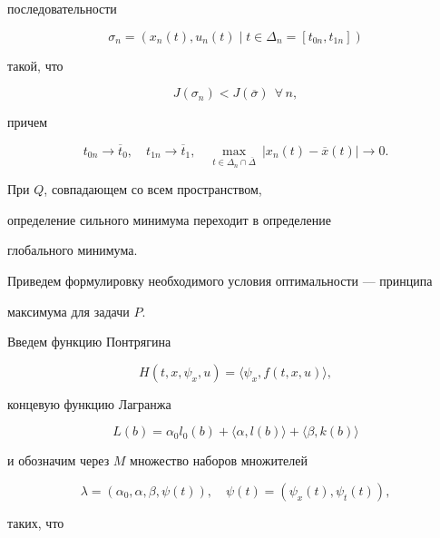 последовательности


$$


\sigma_n =(x_n (t),u_n (t)\mid t\in\Delta_n =\left[t_{0n},


t_{1n}\right])


$$


такой, что


$$


J(\sigma_n) < J(\overline{\sigma}) \ \ \forall\, n,


$$


причем


$$


t_{0n}\rightarrow\overline{t}_0, \quad


t_{1n}\rightarrow\overline{t}_1, \quad


\max\limits_{t\in \Delta_n \cap \overline{\Delta}}~\left| x_n


(t)-\overline{x}(t)\right| \rightarrow 0.


$$


При $Q$, совпадающем со всем пространством,


определение сильного минимума переходит в определение


глобального минимума.





Приведем формулировку необходимого условия оптимальности --- принципа


максимума для задачи $P$.





Введем функцию Понтрягина


$$


H(t,x,\psi_x, u)=\langle\psi_x, f(t,x,u)\rangle,


$$


концевую функцию Лагранжа


$$


L(b)=\alpha_0 l_0 (b)+\langle\alpha, l(b)\rangle +\langle\beta


,k(b)\rangle


$$


и обозначим через $M$ множество наборов множителей


$$


\lambda =(\alpha_0, \alpha, \beta, \psi (t)), \quad


\psi (t)=(\psi_x (t), \psi_t (t)),


$$


таких, что


